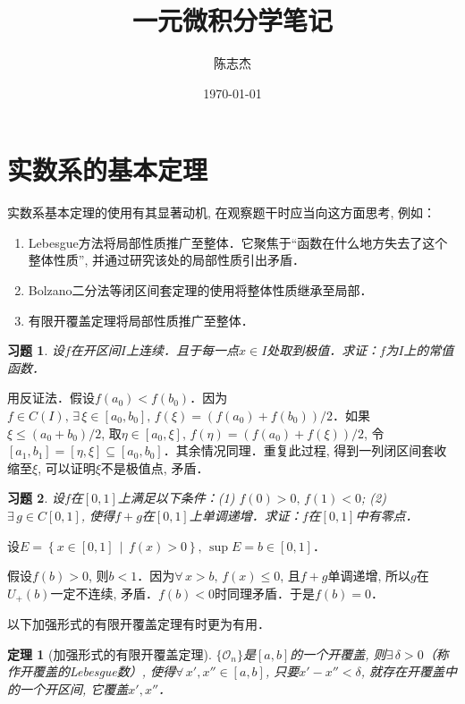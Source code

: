 \documentclass[11pt,a4paper]{ctexart}
\title{一元微积分学笔记}
\author{陈志杰}
\date{\today}
\makeatletter
\theoremstyle{thmseries} %
\newtheorem{thm}{定理}[section]
\theoremstyle{exerseries}
\newtheorem{exer}{习题}[section]
\renewenvironment{proof}[1][\proofname]{\par
  \pushQED{\qed}%
  \normalfont \topsep6\p@\@plus6\p@\relax
  \trivlist
  \item[\hskip\labelsep
        \itshape
    #1\@addpunct{}]\ignorespaces
}{%
  \popQED\endtrivlist\@endpefalse
}
\newenvironment{pf}{\begin{proof}[\bfseries\upshape 证\quad]}{\end{proof}}
\newcommand{\cbra}[1]{\mathopen{}\left\{#1\right\}}
\makeatother
\begin{document}
\maketitle
\thispagestyle{empty}
\tableofcontents
\justifying
\newpage


\section{实数系的基本定理}
实数系基本定理的使用有其显著动机, 在观察题干时应当向这方面思考, 例如：
\begin{enumerate}
	\item Lebesgue方法将局部性质推广至整体．它聚焦于``函数在什么地方失去了这个整体性质'', 并通过研究该处的局部性质引出矛盾．
	\item Bolzano二分法等闭区间套定理的使用将整体性质继承至局部．
	\item 有限开覆盖定理将局部性质推广至整体．
\end{enumerate}

\begin{exer}
	设$f$在开区间$I$上连续．且于每一点$x\in I$处取到极值．求证：$f$为$I$上的常值函数．
\end{exer}
\begin{pf}
	用反证法．假设$f(a_0)<f(b_0)$．因为$f\in C(I),\,\exists\,\xi\in[a_0,b_0],\,f(\xi)=(f(a_0)+f(b_0))/2$．如果$\xi\leq(a_0+b_0)/2$, 取$\eta\in[a_0,\xi],\,f(\eta)=(f(a_0)+f(\xi))/2$, 令$[a_1,b_1]=[\eta,\xi]\subseteq[a_0,b_0]$．其余情况同理．重复此过程, 得到一列闭区间套收缩至$\xi$, 可以证明$\xi$不是极值点, 矛盾．
\end{pf}

\begin{exer}
	设$f$在$[0,1]$上满足以下条件：(1) $f(0)>0,\,f(1)<0$; (2) $\exists\,g\in C[0,1]$, 使得$f+g$在$[0,1]$上单调递增．求证：$f$在$[0,1]$中有零点．
\end{exer}
\begin{pf}
	设$E=\cbra{x\in[0,1]\,\middle\vert\,f(x)>0},\,\sup E=b\in[0,1]$．
	
	假设$f(b)>0$, 则$b<1$．因为$\forall\,x>b,\,f(x)\leq0$, 且$f+g$单调递增, 所以$g$在$U_+(b)$一定不连续, 矛盾．$f(b)<0$时同理矛盾．于是$f(b)=0$．
\end{pf}

以下加强形式的有限开覆盖定理有时更为有用．
\begin{thm}[加强形式的有限开覆盖定理]
	$\{\mathcal{O}_n\}$是$[a,b]$的一个开覆盖, 则$\exists\,\delta>0$（称作开覆盖的Lebesgue数）, 使得$\forall\,x',x''\in[a,b]$, 只要$x'-x''<\delta$, 就存在开覆盖中的一个开区间, 它覆盖$x',x''$．
\end{thm}
\end{document}
